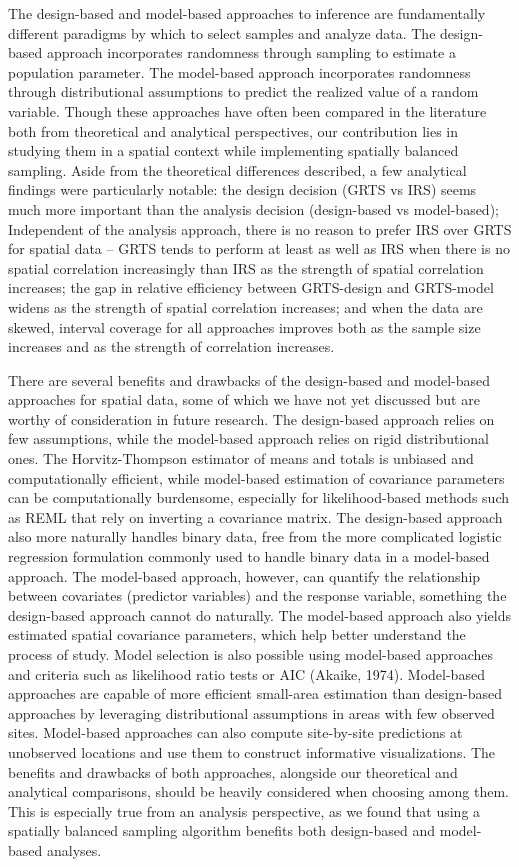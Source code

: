 \documentclass[]{elsarticle} %
\begin{document}
The design-based and model-based approaches to inference are
fundamentally different paradigms by which to select samples and analyze
data. The design-based approach incorporates randomness through sampling
to estimate a population parameter. The model-based approach
incorporates randomness through distributional assumptions to predict
the realized value of a random variable. Though these approaches have
often been compared in the literature both from theoretical and
analytical perspectives, our contribution lies in studying them in a
spatial context while implementing spatially balanced sampling. Aside
from the theoretical differences described, a few analytical findings
were particularly notable: the design decision (GRTS vs IRS) seems much
more important than the analysis decision (design-based vs model-based);
Independent of the analysis approach, there is no reason to prefer IRS
over GRTS for spatial data -- GRTS tends to perform at least as well as
IRS when there is no spatial correlation increasingly than IRS as the
strength of spatial correlation increases; the gap in relative
efficiency between GRTS-design and GRTS-model widens as the strength of
spatial correlation increases; and when the data are skewed, interval
coverage for all approaches improves both as the sample size increases
and as the strength of correlation increases.

There are several benefits and drawbacks of the design-based and
model-based approaches for spatial data, some of which we have not yet
discussed but are worthy of consideration in future research. The
design-based approach relies on few assumptions, while the model-based
approach relies on rigid distributional ones. The Horvitz-Thompson
estimator of means and totals is unbiased and computationally efficient,
while model-based estimation of covariance parameters can be
computationally burdensome, especially for likelihood-based methods such
as REML that rely on inverting a covariance matrix. The design-based
approach also more naturally handles binary data, free from the more
complicated logistic regression formulation commonly used to handle
binary data in a model-based approach. The model-based approach,
however, can quantify the relationship between covariates (predictor
variables) and the response variable, something the design-based
approach cannot do naturally. The model-based approach also yields
estimated spatial covariance parameters, which help better understand
the process of study. Model selection is also possible using model-based
approaches and criteria such as likelihood ratio tests or AIC (Akaike,
1974). Model-based approaches are capable of more efficient small-area
estimation than design-based approaches by leveraging distributional
assumptions in areas with few observed sites. Model-based approaches can
also compute site-by-site predictions at unobserved locations and use
them to construct informative visualizations. The benefits and drawbacks
of both approaches, alongside our theoretical and analytical
comparisons, should be heavily considered when choosing among them. This
is especially true from an analysis perspective, as we found that using
a spatially balanced sampling algorithm benefits both design-based and
model-based analyses.
\end{document}
